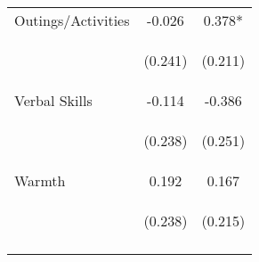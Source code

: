 \begin{tabular}{lcc}
\noalign{\smallskip}Outings/Activities & -0.026 & 0.378*\\
 & \begin{footnotesize}(0.241)\end{footnotesize} & \begin{footnotesize}(0.211)\end{footnotesize}\\
\noalign{\smallskip}Verbal Skills & -0.114 & -0.386\\
 & \begin{footnotesize}(0.238)\end{footnotesize} & \begin{footnotesize}(0.251)\end{footnotesize}\\
\noalign{\smallskip}Warmth & 0.192 & 0.167\\
 & \begin{footnotesize}(0.238)\end{footnotesize} & \begin{footnotesize}(0.215)\end{footnotesize}\\
\noalign{\smallskip}\hline\end{tabular}\\
